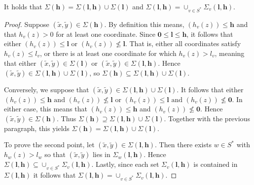 \begin{lemma}\label{lem:covering}
It holds that $\Sigma(\mathbf{h})=\Sigma(\mathbf{l},\mathbf{h})\cup \Sigma(\mathbf{l})$ and $\Sigma(\mathbf{l},\mathbf{h})=\cup_{v \in S^*}\Sigma_v(\mathbf{l},\mathbf{h})$.
\end{lemma}
\begin{proof}

Suppose $(\tilde{x},\tilde{y}) \in \Sigma(\mathbf{h})$. By definition this means, $(h_v(z))\leq \mathbf{h}$ and that $h_v(z) > 0$ for at least one coordinate. Since $\mathbf{0} \leq \mathbf{l} \leq \mathbf{h}$, it follows that either $(h_v(z))\leq \mathbf{l}$ or $(h_v(z))\nleq \mathbf{l}$. That is, either all coordinates satisfy $h_v(z) \leq l_v$, or there is at least one coordinate for which $h_v(z) > l_v$, meaning that either $(\tilde{x},\tilde{y}) \in \Sigma(\mathbf{l})$ or $(\tilde{x},\tilde{y}) \in \Sigma(\mathbf{l},\mathbf{h})$. Hence $(\tilde{x},\tilde{y}) \in \Sigma(\mathbf{l},\mathbf{h}) \cup \Sigma(\mathbf{l})$, so $\Sigma(\mathbf{h}) \subseteq \Sigma(\mathbf{l},\mathbf{h}) \cup \Sigma(\mathbf{l})$.

Conversely, we suppose that $(\tilde{x},\tilde{y}) \in \Sigma(\mathbf{l},\mathbf{h}) \cup \Sigma(\mathbf{l})$. It follows that either $(h_v(z))\leq \mathbf{h} \text{ and } (h_v(z))\nleq \mathbf{l}$ or $(h_v(z))\leq \mathbf{l} \text{ and } (h_v(z))\nleq \mathbf{0}$. In either case, this means that $(h_v(z)) \leq \mathbf{h}$ and $(h_v(z)) \nleq \mathbf{0}$. Hence $(\tilde{x},\tilde{y}) \in \Sigma(\mathbf{h})$. Thus $\Sigma(\mathbf{h}) \supseteq \Sigma(\mathbf{l},\mathbf{h}) \cup \Sigma(\mathbf{l})$. Together with the previous paragraph, this yields $\Sigma(\mathbf{h})=\Sigma(\mathbf{l},\mathbf{h})\cup \Sigma(\mathbf{l})$.

To prove the second point, let $(\tilde{x},\tilde{y}) \in \Sigma(\mathbf{l},\mathbf{h})$. Then there exists $w\in S^*$ with $h_w(z)>l_w$ so that $(\tilde{x},\tilde{y})$ lies in $\Sigma_w(\mathbf{l},\mathbf{h})$. Hence $\Sigma(\mathbf{l},\mathbf{h}) \subseteq \cup_{v\in S^*}\Sigma_v(\mathbf{l},\mathbf{h})$. Lastly, since each set $\Sigma_v(\mathbf{l},\mathbf{h})$ is contained in $\Sigma(\mathbf{l},\mathbf{h})$ it follows that $\Sigma(\mathbf{l},\mathbf{h})=\cup_{v\in S^*}\Sigma_v(\mathbf{l},\mathbf{h})$.
\end{proof}

